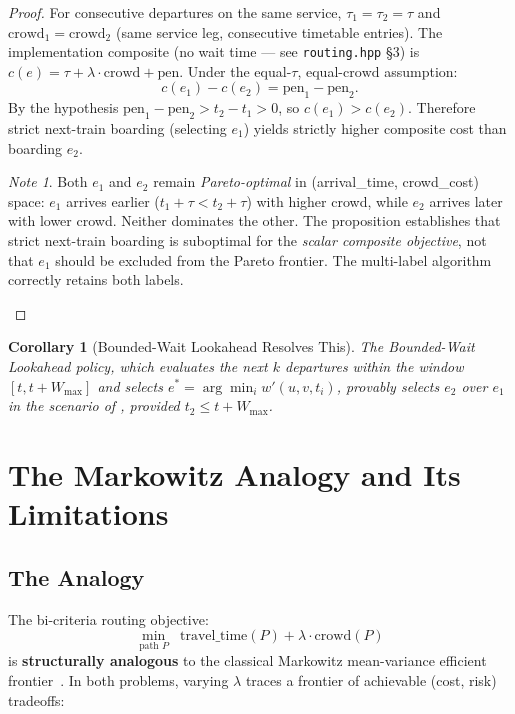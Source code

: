 \documentclass[11pt, a4paper]{article}
\newtheorem{corollary}[theorem]{Corollary}
\theoremstyle{remark}
\newtheorem*{note}{Note}
\newcommand{\wmax}{W_{\max}}
\newcommand{\crowd}{\mathrm{crowd}}
\newcommand{\pen}{\mathrm{pen}}
\begin{document}
\begin{proof}
    For consecutive departures on the same service, $\tau_1 = \tau_2 = \tau$
    and $\crowd_1 = \crowd_2$ (same service leg, consecutive timetable entries).
    The implementation composite (no wait time — see \texttt{routing.hpp} §3)
    is $c(e) = \tau + \lambda\cdot\crowd + \pen$.
    Under the equal-$\tau$, equal-$\crowd$ assumption:
    \[
        c(e_1) - c(e_2) = \pen_1 - \pen_2.
    \]
    By the hypothesis $\pen_1 - \pen_2 > t_2 - t_1 > 0$, so
    $c(e_1) > c(e_2)$. Therefore strict next-train boarding (selecting $e_1$)
    yields strictly higher composite cost than boarding $e_2$.

    \begin{note}
    Both $e_1$ and $e_2$ remain \emph{Pareto-optimal} in (arrival\_time,
    crowd\_cost) space: $e_1$ arrives earlier ($t_1 + \tau < t_2 + \tau$) with
    higher crowd, while $e_2$ arrives later with lower crowd. Neither dominates
    the other. The proposition establishes that strict next-train boarding is
    suboptimal for the \emph{scalar composite objective}, not that $e_1$ should
    be excluded from the Pareto frontier. The multi-label algorithm correctly
    retains both labels.
    \end{note}
\end{proof}

\begin{corollary}[Bounded-Wait Lookahead Resolves This]
    The Bounded-Wait Lookahead policy, which evaluates the next $k$ departures
    within the window $[t, t + \wmax]$ and selects $e^* = \arg\min_i w'(u,v,t_i)$,
    provably selects $e_2$ over $e_1$ in the scenario of
    , provided $t_2 \le t + \wmax$.
\end{corollary}

\section{The Markowitz Analogy and Its Limitations}

\subsection{The Analogy}

The bi-criteria routing objective:
\[
    \min_{\text{path } P} \;\; \text{travel\_time}(P) + \lambda \cdot \crowd(P)
\]
is \textbf{structurally analogous} to the classical Markowitz mean-variance
efficient frontier~\cite{markowitz1952}. In both problems, varying $\lambda$
traces a frontier of achievable (cost, risk) tradeoffs:
\end{document}
